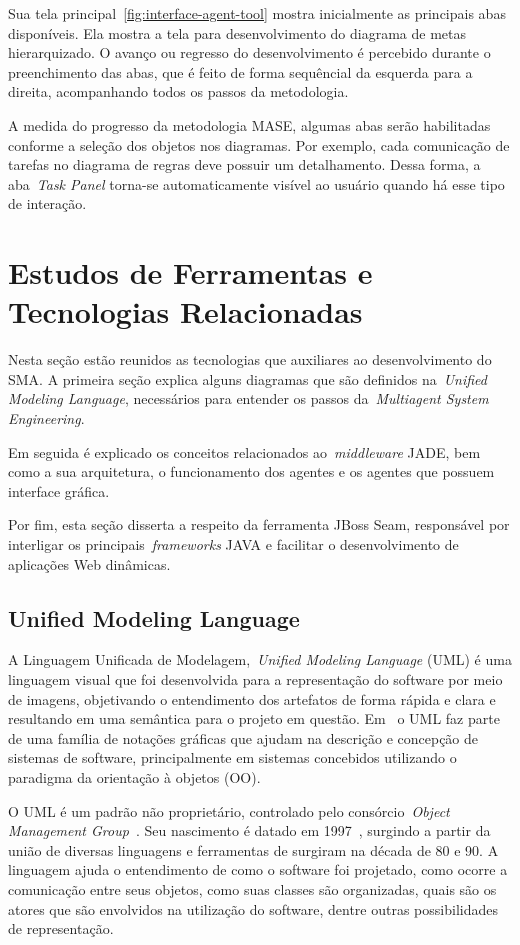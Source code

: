 Sua tela principal~\ref{fig:interface-agent-tool} mostra inicialmente as principais abas disponíveis. Ela mostra a tela para desenvolvimento do diagrama de metas hierarquizado. O avanço ou regresso do desenvolvimento é percebido durante o preenchimento das abas, que é feito de forma sequêncial da esquerda para a direita, acompanhando todos os passos da metodologia.

A medida do progresso da metodologia MASE, algumas abas serão habilitadas conforme a seleção dos objetos nos diagramas. Por exemplo, cada comunicação de tarefas no diagrama de regras deve possuir um detalhamento. Dessa forma, a aba~\emph{Task Panel} torna-se automaticamente visível ao usuário quando há esse tipo de interação.

\section{Estudos de Ferramentas e Tecnologias Relacionadas}

Nesta seção estão reunidos as tecnologias que auxiliares ao desenvolvimento do SMA. A primeira seção explica alguns diagramas que são definidos na~\emph{Unified Modeling Language}, necessários para entender os passos da~\emph{Multiagent System Engineering}.
 
Em seguida é explicado os conceitos relacionados ao~\emph{middleware} JADE, bem como a sua arquitetura, o funcionamento dos agentes e os agentes que possuem interface gráfica.

Por fim, esta seção disserta a respeito da ferramenta JBoss Seam, responsável por interligar os principais~\emph{frameworks} JAVA e facilitar o desenvolvimento de aplicações Web dinâmicas.

\subsection{Unified Modeling Language}

A Linguagem Unificada de Modelagem,~\emph{Unified Modeling Language} (UML) é uma linguagem visual que foi desenvolvida para a representação do software por meio de imagens, objetivando o entendimento dos artefatos de forma rápida e clara e resultando em uma semântica para o projeto em questão. Em~\cite{fowler04} o UML faz parte de uma família de notações gráficas que ajudam na descrição e concepção de sistemas de software, principalmente em sistemas concebidos utilizando o paradigma da orientação à objetos (OO).

O UML é um padrão não proprietário, controlado pelo consórcio~\emph{Object Management Group}~\cite{omg20}. Seu nascimento é datado em 1997~\cite{fowler04}, surgindo a partir da união de diversas linguagens e ferramentas de surgiram na década de 80 e 90.
A linguagem ajuda o entendimento de como o software foi projetado, como ocorre a comunicação entre seus objetos, como suas classes são organizadas, quais são os atores que são envolvidos na utilização do software, dentre outras possibilidades de representação.

